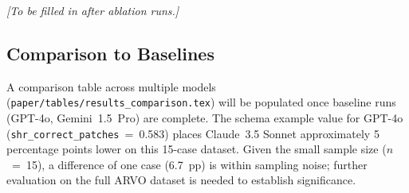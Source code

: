 \textit{[To be filled in after ablation runs.]}

\subsection{Comparison to Baselines}
\label{sec:results-comparison}

A comparison table across multiple models (\texttt{paper/tables/results\_comparison.tex})
will be populated once baseline runs (GPT-4o, Gemini~1.5~Pro) are complete.
The schema example value for GPT-4o (\texttt{shr\_correct\_patches}~=~0.583) places
Claude~3.5 Sonnet approximately 5 percentage points lower on this 15-case dataset.
Given the small sample size ($n$~=~15), a difference of one case (6.7~pp) is
within sampling noise; further evaluation on the full \textsc{ARVO} dataset is
needed to establish significance.
